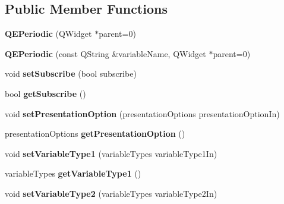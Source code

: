 \subsection*{Public Member Functions}
\begin{DoxyCompactItemize}
\item 
\hypertarget{classQEPeriodic_a976c29b07d5f2cd0d21e4643906dd09f}{
{\bfseries QEPeriodic} (QWidget $\ast$parent=0)}
\label{classQEPeriodic_a976c29b07d5f2cd0d21e4643906dd09f}

\item 
\hypertarget{classQEPeriodic_af6b872b7b42f0a7055da552394e14ccf}{
{\bfseries QEPeriodic} (const QString \&variableName, QWidget $\ast$parent=0)}
\label{classQEPeriodic_af6b872b7b42f0a7055da552394e14ccf}

\item 
\hypertarget{classQEPeriodic_a5604cdf03741ec3c87fae189629b7f25}{
void {\bfseries setSubscribe} (bool subscribe)}
\label{classQEPeriodic_a5604cdf03741ec3c87fae189629b7f25}

\item 
\hypertarget{classQEPeriodic_af29344ac5123bbaa6a37c31795b660fe}{
bool {\bfseries getSubscribe} ()}
\label{classQEPeriodic_af29344ac5123bbaa6a37c31795b660fe}

\item 
\hypertarget{classQEPeriodic_aeb43f11334dc5c5488004e88b557126c}{
void {\bfseries setPresentationOption} (presentationOptions presentationOptionIn)}
\label{classQEPeriodic_aeb43f11334dc5c5488004e88b557126c}

\item 
\hypertarget{classQEPeriodic_a266014f9bfc6ac510e16c19c01c04578}{
presentationOptions {\bfseries getPresentationOption} ()}
\label{classQEPeriodic_a266014f9bfc6ac510e16c19c01c04578}

\item 
\hypertarget{classQEPeriodic_a1b0f1d55252a258734e3a07548c2ff13}{
void {\bfseries setVariableType1} (variableTypes variableType1In)}
\label{classQEPeriodic_a1b0f1d55252a258734e3a07548c2ff13}

\item 
\hypertarget{classQEPeriodic_a86783337d2087191e708a0f0245caeef}{
variableTypes {\bfseries getVariableType1} ()}
\label{classQEPeriodic_a86783337d2087191e708a0f0245caeef}

\item 
\hypertarget{classQEPeriodic_a27a44f30a1f323f8ef6e7eaba058aa3e}{
void {\bfseries setVariableType2} (variableTypes variableType2In)}
\label{classQEPeriodic_a27a44f30a1f323f8ef6e7eaba058aa3e}


\end{DoxyCompactItemize}
